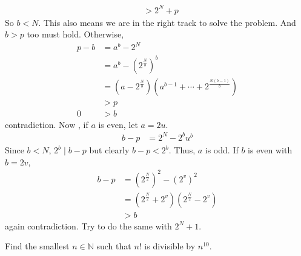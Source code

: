 \documentclass[problems.tex]{subfile}
\begin{document}
\begin{solution}
\begin{align*}
					  & > 2^N+p
			\end{align*}
		So $b<N$. This also means we are in the right track to solve the problem. And $b>p$ too must hold. Otherwise,
			\begin{align*}
				p-b & = a^b-2^N\\
					& = a^b-\left(2^{\frac{N}{b}}\right)^b\\
					& = \left(a-2^{\frac{N}{b}}\right)\left(a^{b-1}+\cdots+2^{\frac{N(b-1)}{b}}\right)\\
					& > p\\
				0	& > b
			\end{align*}
		contradiction.  Now , if $a$ is even, let $a=2u$.
			\begin{align*}
				b-p & = 2^N-2^bu^b
			\end{align*}
		Since $b<N$, $2^b\mid b-p$ but clearly $b-p<2^b$. Thus, $a$ is odd. If $b$ is even with $b=2v$,
			\begin{align*}
				b-p & = \left(2^{\frac{N}{2}}\right)^2-\left(2^v\right)^2\\
					& = \left(2^{\frac{N}{2}}+2^v\right)\left(2^{\frac{N}{2}}-2^v\right)\\
					& > b
			\end{align*}
		again contradiction. Try to do the same with $2^N+1$.
	\end{solution}

	\begin{problem}[Columbia $2010$]
		Find the smallest $n\in\mathbb{N}$ such that $n!$ is divisible by $n^{10}$.
	\end{problem}
\end{document}
